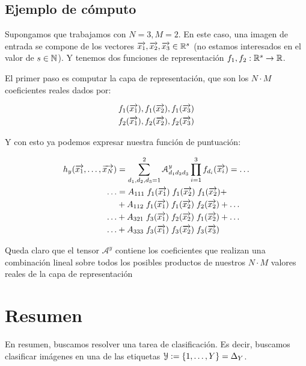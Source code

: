 \subsection{Ejemplo de cómputo} \label{ejemplo:funcion_puntuacion}

Supongamos que trabajamos con $N = 3, M = 2$. En este caso, una imagen de entrada se compone de los vectores $\overrightarrow{x_1}, \overrightarrow{x_2}, \overrightarrow{x_3} \in \mathbb{R}^s$ (no estamos interesados en el valor de $s \in \mathbb{N}$). Y tenemos dos funciones de representación $f_1, f_2: \mathbb{R}^s \to \mathbb{R}$.

El primer paso es computar la capa de representación, que son los $N \cdot M$ coeficientes reales dados por:

\begin{equation}
	\begin{split}
		f_1(\overrightarrow{x_1}), f_1(\overrightarrow{x_2}), f_1(\overrightarrow{x_3}) \\
		f_2(\overrightarrow{x_1}), f_2(\overrightarrow{x_2}), f_2(\overrightarrow{x_3})
	\end{split}
\end{equation}

Y con esto ya podemos expresar nuestra función de puntuación:

\begin{equation}
	\begin{split}
		h_y(\overrightarrow{x_1}, \ldots, \overrightarrow{x_N}) &= \sum_{d_1, d_2, d_3 = 1}^{2} \mathcal{A}^y_{d_1 d_2 d_3} \prod_{i = 1}^3 f_{d_i}(\overrightarrow{x_i}) = \ldots \\
		\ldots &= A_{111} \; f_1(\overrightarrow{x_1}) \; f_1(\overrightarrow{x_2}) \; f_1(\overrightarrow{x_2}) + \\
		&+ A_{112} \; f_1(\overrightarrow{x_1}) \; f_1(\overrightarrow{x_2}) \; f_2(\overrightarrow{x_2}) + \ldots \\
		\ldots &+ A_{321} \; f_3(\overrightarrow{x_1}) \; f_2(\overrightarrow{x_2}) \; f_1(\overrightarrow{x_2}) + \ldots \\
		\ldots &+ A_{333} \; f_3(\overrightarrow{x_1}) \; f_3(\overrightarrow{x_2}) \; f_3(\overrightarrow{x_3})
	\end{split}
\end{equation}

Queda claro que el tensor $\mathcal{A}^y$ contiene los coeficientes que realizan una combinación lineal sobre todos los posibles productos de nuestros $N \cdot M$ valores reales de la capa de representación

\section{Resumen}

En resumen, buscamos resolver una tarea de clasificación. Es decir, buscamos clasificar imágenes en una de las etiquetas $\mathcal{Y} := \{1, \ldots, Y\} = \Delta_{Y}$.

